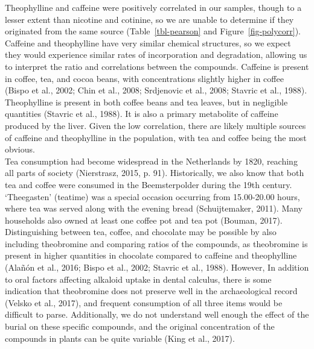 \documentclass[
]{article}
\begin{document}
Theophylline and caffeine were positively correlated in our samples,
though to a lesser extent than nicotine and cotinine, so we are unable
to determine if they originated from the same source
(Table~\ref{tbl-pearson} and Figure~\ref{fig-polycorr}). Caffeine and
theophylline have very similar chemical structures, so we expect they
would experience similar rates of incorporation and degradation,
allowing us to interpret the ratio and correlations between the
compounds. Caffeine is present in coffee, tea, and cocoa beans, with
concentrations slightly higher in coffee (Bispo et al., 2002; Chin et
al., 2008; Srdjenovic et al., 2008; Stavric et al., 1988). Theophylline
is present in both coffee beans and tea leaves, but in negligible
quantities (Stavric et al., 1988). It is also a primary metabolite of
caffeine produced by the liver. Given the low correlation, there are
likely multiple sources of caffeine and theophylline in the population,
with tea and coffee being the most obvious.\\
Tea consumption had become widespread in the Netherlands by 1820,
reaching all parts of society (Nierstrasz, 2015, p. 91). Historically,
we also know that both tea and coffee were consumed in the
Beemsterpolder during the 19th century. `Theegasten' (teatime) was a
special occasion occurring from 15.00-20.00 hours, where tea was served
along with the evening bread (Schuijtemaker, 2011). Many households also
owned at least one coffee pot and tea pot (Bouman, 2017). Distinguishing
between tea, coffee, and chocolate may be possible by also including
theobromine and comparing ratios of the compounds, as theobromine is
present in higher quantities in chocolate compared to caffeine and
theophylline (Alañón et al., 2016; Bispo et al., 2002; Stavric et al.,
1988). However, In addition to oral factors affecting alkaloid uptake in
dental calculus, there is some indication that theobromine does not
preserve well in the archaeological record (Velsko et al., 2017), and
frequent consumption of all three items would be difficult to parse.
Additionally, we do not understand well enough the effect of the burial
on these specific compounds, and the original concentration of the
compounds in plants can be quite variable (King et al., 2017).
\end{document}
